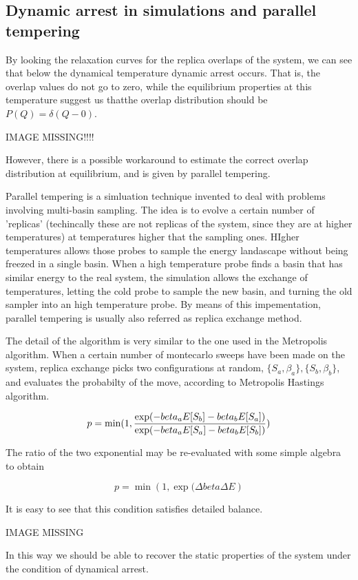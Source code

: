 

\subsection{Dynamic arrest in simulations and parallel tempering}

By looking the relaxation curves for the replica overlaps of the system, we can see that below the dynamical temperature dynamic arrest occurs. That is, the overlap values do not go to zero, while the equilibrium properties at this temperature suggest us thatthe overlap distribution should be $P(Q) = \delta(Q-0)$.

IMAGE MISSING!!!!

However, there is a possible workaround to estimate the correct overlap distribution at equilibrium, and is given by parallel tempering. 

Parallel tempering is a simluation technique invented to deal with problems involving multi-basin sampling.
The idea is to evolve a certain number of 'replicas' (techincally these are not replicas of the system, since they are at higher temperatures) at temperatures higher that the sampling ones.
HIgher temperatures allows those probes to sample the energy landascape without being freezed in a single basin.
When a high temperature probe finds a basin that has similar energy to the real system, the simulation allows the exchange of temperatures, letting the cold probe to sample the new basin, and turning the old sampler into an high temperature probe. By means of this impementation, parallel tempering is usually also referred as replica exchange method.

The detail of the algorithm is very similar to the one used in the Metropolis algorithm. When a certain number of montecarlo sweeps have been made on the system, replica exchange picks two configurations at random, $\{S_a,\beta_a\},\{S_b,\beta_b\}$, and evaluates the probabilty of the move, according to Metropolis Hastings algorithm. 

\begin{equation}
p = \min ( 1, { \exp( -beta_a E[S_b] - beta_b E[S_a]) \over \exp( -beta_a E[S_a] - beta_b E[S_b])   } )
\end{equation}

The ratio of the two exponential may be re-evaluated with some simple algebra to obtain

\begin{equation}
p = \min ( 1, { \exp(  \Delta beta \Delta E   } ) 
\end{equation}

It is easy to see that this condition satisfies detailed balance.

IMAGE MISSING

In this way we should be able to recover the static properties of the system under the condition of dynamical arrest.

